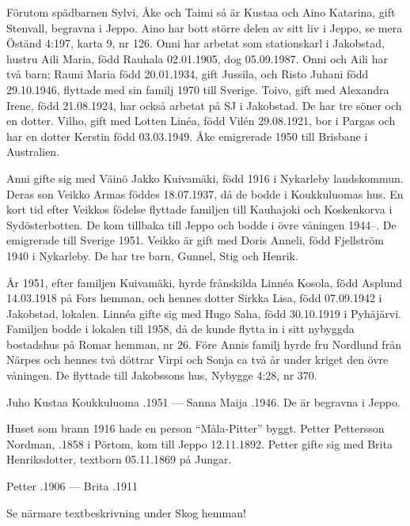 Förutom spädbarnen Sylvi, Åke och Taimi så är Kustaa och Aino	Katarina, gift Stenvall, begravna i Jeppo. Aino har bott större delen av sitt liv i Jeppo, se mera Öständ 4:197, karta 9, nr 126. Onni har arbetat som 	stationskarl i Jakobstad, hustru Aili Maria, född Rauhala 02.01.1905, dog	05.09.1987. Onni och Aili har två barn; Rauni Maria född 20.01.1934, gift Jussila, och Risto Juhani född 29.10.1946, flyttade med sin familj 1970	till Sverige. Toivo, gift med Alexandra Irene, född 21.08.1924, har också	arbetat på SJ i Jakobstad. De har tre söner och en dotter. Vilho, gift med	Lotten Linéa, född Vilén 29.08.1921, bor i Pargas och har en dotter	Kerstin född 03.03.1949. Åke emigrerade 1950 till Brisbane i Australien.

Anni gifte sig med Väinö Jakko Kuivamäki, född 1916 i Nykarleby landskommun. Deras son Veikko Armas föddes 18.07.1937, då de bodde i Koukkuluomas hus. En kort tid efter Veikkos födelse flyttade familjen till Kauhajoki och Koskenkorva i Sydösterbotten. De kom tillbaka till Jeppo och bodde i övre våningen 1944--. De emigrerade till Sverige 1951. Veikko är gift med Doris Anneli, född Fjellström 1940 i Nykarleby. De har tre barn, Gunnel, Stig och Henrik.

År 1951, efter familjen Kuivamäki, hyrde frånskilda Linnéa Kosola, född Asplund 14.03.1918 på Fors hemman, och hennes dotter Sirkka Lisa, född 07.09.1942 i Jakobstad, lokalen. Linnéa gifte sig med	Hugo Saha, född 30.10.1919 i Pyhäjärvi. Familjen bodde i lokalen till 1958, då de kunde flytta in i sitt nybyggda bostadshus på Romar hemman, nr 26. Före Annis familj hyrde fru Nordlund från Närpes och hennes två döttrar Virpi och Sonja ca två år under kriget den övre våningen. De flyttade till Jakobssons hus, Nybygge 4:28, nr 370.

Juho Kustaa Koukkuluoma .1951  ---  Sanna Maija .1946. De är begravna i Jeppo.

Huset som brann 1916 hade en person ``Måla-Pitter'' byggt. Petter Pettersson Nordman, .1858 i Pörtom, kom till Jeppo 12.11.1892. Petter gifte sig med Brita Henriksdotter, textborn 05.11.1869 på Jungar.

Petter .1906  ---  Brita .1911




Se närmare textbeskrivning under Skog hemman!
